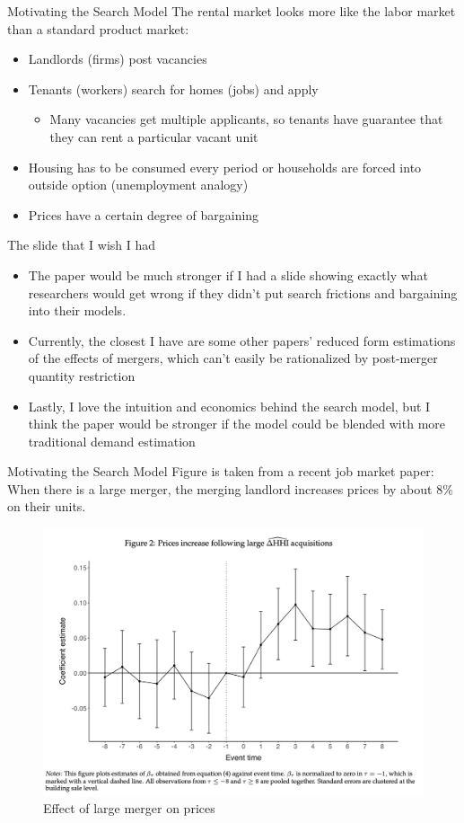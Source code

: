 \documentclass[10pt, xcolor=dvipsnames]{beamer}
\begin{document}
\begin{frame}{Motivating the Search Model}
The rental market looks more like the labor market than a standard product market:\\
    \begin{itemize}
        \item Landlords (firms) post vacancies
        \item Tenants (workers) search for homes (jobs) and apply
        \begin{itemize}
            \item Many vacancies get multiple applicants, so tenants have guarantee that they can rent a particular vacant unit
        \end{itemize}
        \item Housing has to be consumed every period or households are forced into outside option (unemployment analogy)
        \item Prices have a certain degree of bargaining
    \end{itemize}
    
\end{frame}

\begin{frame}{The slide that I wish I had}

\begin{itemize}
    \item The paper would be much stronger if I had a slide showing exactly what researchers would get wrong if they didn't put search frictions and bargaining into their models.
    \item Currently, the closest I have are some other papers' reduced form estimations of the effects of mergers, which can't easily be rationalized by post-merger quantity restriction
    \item Lastly, I love the intuition and economics behind the search model, but I think the paper would be stronger if the model could be blended with more traditional demand estimation
\end{itemize}
    
\end{frame}

\begin{frame}{Motivating the Search Model}
Figure is taken from a recent job market paper: When there is a large merger, the merging landlord increases prices by about 8\% on their units.
    \begin{figure}
        \centering
        \includegraphics[width=0.5\linewidth]{figs/fern-jmp-prices.png}
        \caption{Effect of large merger on prices}
        \label{fig:fern-prices}
    \end{figure}
\end{frame}
\end{document}
